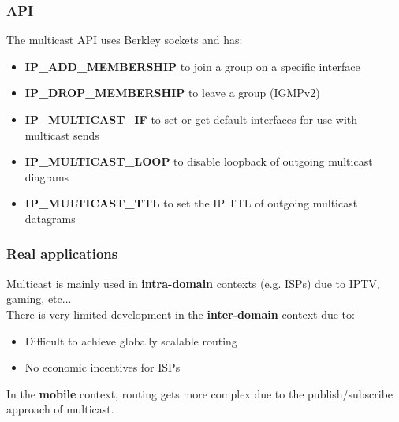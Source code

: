 \subsubsection{API}
The multicast API uses Berkley sockets and has:
\begin{itemize}
	\item \textbf{IP\_ADD\_MEMBERSHIP} to join a group on a specific interface
	\item \textbf{IP\_DROP\_MEMBERSHIP} to leave a group (IGMPv2)
	\item \textbf{IP\_MULTICAST\_IF} to set or get default interfaces for use with multicast sends
	\item \textbf{IP\_MULTICAST\_LOOP} to disable loopback of outgoing multicast diagrams
	\item \textbf{IP\_MULTICAST\_TTL} to set the IP TTL of outgoing multicast datagrams
\end{itemize}

\subsubsection{Real applications}
Multicast is mainly used in \textbf{intra-domain} contexts (e.g. ISPs) due to IPTV, gaming, etc...\\
There is very limited development in the \textbf{inter-domain} context due to:
\begin{itemize}
	\item Difficult to achieve globally scalable routing
	\item No economic incentives for ISPs
\end{itemize}

\begin{note}
	In the \textbf{mobile} context, routing gets more complex due to the publish/subscribe approach of multicast.
\end{note}